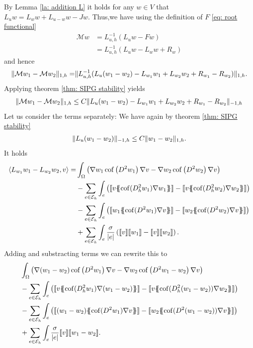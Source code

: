 By Lemma \ref{la: addition L} it holds for any $w \in V$ that $L_{u}w = L_{w}w + L_{u-w}w -Jw$. Thus,we have using the definition of $F$ \eqref{eq: root functional}
\begin{align*}
	\mathcal M w &= L_{u,h}^{-1}(L_u w - Fw) \\
				 &= L_{u,h}^{-1}(L_uw - L_w w + R_w)
 \end{align*}
and hence
\begin{align*}
	\lVert \mathcal M w_1 - \mathcal M w_2 \rVert_{1,h} =& \lVert L_{u,h}^{-1}(L_{u}(w_1-w_2)-L_{w_1}w_1+L_{w_2}w_2+ R_{w_1} - R_{w_2}) \rVert_{1,h}. \\
\end{align*}
Applying theorem \ref{thm: SIPG stability} yields
\begin{align}
	\lVert \mathcal M w_1 - \mathcal M w_2 \rVert_{1,h}	\leq C \lVert L_{u}(w_1-w_2)-L_{w_1}w_1+L_{w_2}w_2+ R_{w_1} - R_{w_2}  \rVert_{-1,h} \label{eq: estimate M}
\end{align}
Let us consider the terms separately:
We have again by theorem \ref{thm: SIPG stability}
\begin{align}
\lVert L_{u}(w_1-w_2) \rVert_{-1,h} \leq C \lVert w_1 - w_2 \rVert_{1,h}.
\end{align}	
It holds 
\begin{align}
	\bilin{L_{w_1}w_1-L_{w_2}w_2} v =& \int_{\Omega} \left( \nabla w_1 \cofHess{w_1} \nabla v- \nabla w_2 \cofHess{w_2} \nabla v \right) \nonumber\\
	& -\sum\limits_{e \in \edges}\int_{e} \left( \jump {v \average { \cof(D_h^2 w_1) \nabla w_1} } 
					- \jump {v \average { \cof(D_h^2 w_2) \nabla w_2} }\right) \nonumber \\
	&- \sum\limits_{e \in \edges}\int_{e} \left(\jump {w_1 \average{ \cof(D^2 w_1) \nabla v} } 
					- \jump {w_2 \average{ \cof(D^2 w_2) \nabla v} }\right)\nonumber\\  
	&+\sum\limits_{e \in \edges} \int_e \frac \sigma {|e|} \left( \jump {v}  \jump {w_1}-\jump {v}  \jump {w_2} \right).
 \end{align}
Adding and substracting terms we can rewrite this to
\begin{align}
& \int_{\Omega} \left( \nabla (w_1-w_2) \cofHess{w_1} \nabla v- \nabla w_2 \cofHess{w_1 - w_2} \nabla v \right) \nonumber\\
& -\sum\limits_{e \in \edges}\int_{e} \left( \jump {v \average { \cof(D_h^2 w_1) \nabla (w_1-w_2)} } 
- \jump {v \average { \cof(D_h^2 (w_1-w_2)) \nabla w_2} }\right) \nonumber \\
&- \sum\limits_{e \in \edges}\int_{e} \left(\jump {(w_1-w_2) \average{ \cof(D^2 w_1) \nabla v} } 
- \jump {w_2 \average{ \cof(D^2 (w_1-w_2)) \nabla v} }\right)\nonumber\\  
&+\sum\limits_{e \in \edges} \int_e \frac \sigma {|e|} \jump {v}  \jump {w_1-w_2}.
\end{align}
